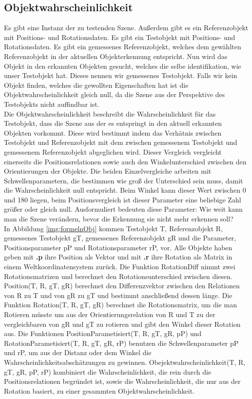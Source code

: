 \subsection{Objektwahrscheinlichkeit}\label{sub:objwahrscheinlichkeit}
Es gibt eine Instanz der zu testenden Szene. Außerdem gibt es ein Referenzobjekt mit Positions- und Rotationsdaten. Es gibt ein Testobjekt mit Positions- und Rotationsdaten. Es gibt ein gemessenes Referenzobjekt, welches dem gewählten Referenzobjekt in der aktuellen Objekterkennung entspricht. Nun wird das Objekt in den erkannten Objekten gesucht, welches die selbe identifikation, wie unser Testobjekt hat. Dieses nennen wir gemessenes Testobjekt. Falls wir kein Objekt finden, welches die gewollten Eigenschaften hat ist die Objektwahrscheinlichkeit gleich null, da die Szene aus der Perspektive des Testobjekts nicht auffindbar ist.\smallskip\\
Die Objektwahrscheinlichkeit beschreibt die Wahrscheinlichkeit für das Testobjekt, dass die Szene aus der es entspringt in den aktuell erkannten Objekten vorkommt. Diese wird bestimmt indem das Verhätnis zwischen Testobjekt und Referenzobjekt mit dem zwischen gemessenem Testobjekt und gemessenem Referenzobjekt abgeglichen wird. Dieser Vergleich vergleicht einerseits die Positionsrelationen sowie auch den Winkelunterschied zwischen den Orientierungen der Objekte. Die beiden Einzelvergleiche arbeiten mit Schwellenparametern, die bestimmen wie groß der Unterschied sein muss, damit die Wahrscheinlichkeit null entspricht. Beim Winkel kann dieser Wert zwischen 0 und 180 liegen, beim Positionsvergleich ist dieser Parameter eine beliebige Zahl größer oder gleich null. Ausformuliert bedeuten diese Parameter: Wie weit kann man die Szene verändern, bevor die Erkennung sie nicht mehr erkennen soll?\smallskip\\
In Abbildung \ref{img:formelnObj} kommen Testobjekt T, Referenzobjekt R, gemessenes Testobjekt gT, gemessenes Referenzobjekt gR und die Parameter, Positionsparameter pP und Rotationsparameter rP, vor. Alle Objekte haben geben mit \textbf{.p} ihre Position als Vektor und mit \textbf{.r} ihre Rotation als Matrix in einem Weltkoordinatensystem zurück. Die Funktion RotationDiff nimmt zwei Rotationsmatrizen und berechnet den Rotationsunterschied zwischen diesen. Position(T, R, gT, gR) berechnet den Differenzvektor zwischen den Relationen von R zu T und von gR zu gT und bestimmt anschließend dessen länge. Die Funktion Rotation(T, R, gT, gR) berechnet die Rotationsmatrix, um die man Rotieren müsste um aus der Orientierungsrelation von R und T zu der vergleichbaren von gR und gT zu rotieren und gibt den Winkel dieser Rotation aus. Die Funktionen PositionParametisiert(T, R, gT, gR, pP) und RotationParametisiert(T, R, gT, gR, rP) benutzen die Schwellenparameter pP und rP, um aus der Distanz oder dem Winkel die Wahrscheinlichkeitsabschätzungen zu gewinnen. Obejektwahrscheinlichkeit(T, R, gT, gR, pP, rP) kombiniert die Wahrscheinlichkeit, die rein durch die Positionsrelationen begründet ist, sowie die Wahrscheinlichkeit, die nur aus der Rotation basiert, zu einer gesammten Objektwahrscheinlichkeit.\smallskip\\
